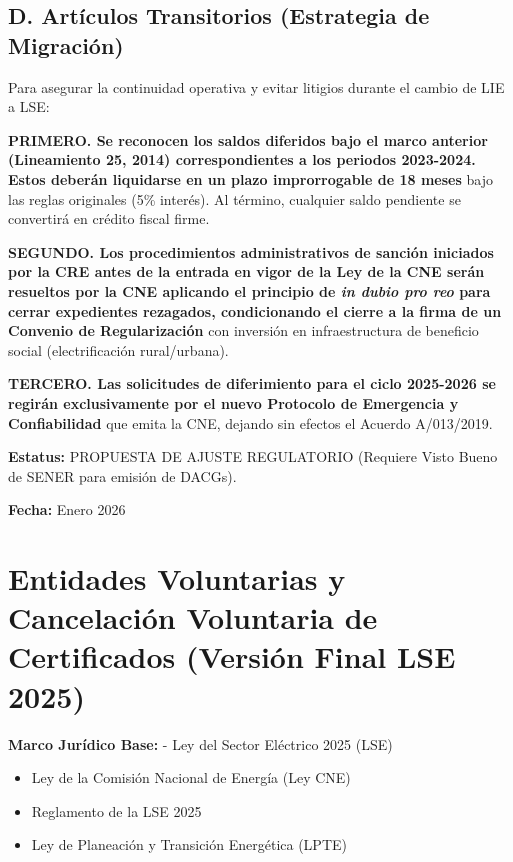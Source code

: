 \documentclass{cel}
\begin{document}
\subsection{D. Artículos Transitorios (Estrategia de Migración)}
\nopagebreak

Para asegurar la continuidad operativa y evitar litigios durante el cambio de LIE a LSE:


\textbf{PRIMERO. \textbf{ Se reconocen los saldos diferidos bajo el marco anterior (Lineamiento 25, 2014) correspondientes a los periodos 2023-2024. Estos deberán liquidarse en un plazo improrrogable de }18 meses} bajo las reglas originales (5\% interés). Al término, cualquier saldo pendiente se convertirá en crédito fiscal firme.


\textbf{SEGUNDO. \textbf{ Los procedimientos administrativos de sanción iniciados por la CRE antes de la entrada en vigor de la Ley de la CNE serán resueltos por la CNE aplicando el principio de \textit{in dubio pro reo} para cerrar expedientes rezagados, condicionando el cierre a la firma de un }Convenio de Regularización} con inversión en infraestructura de beneficio social (electrificación rural/urbana).


\textbf{TERCERO. \textbf{ Las solicitudes de diferimiento para el ciclo 2025-2026 se regirán exclusivamente por el nuevo }Protocolo de Emergencia y Confiabilidad} que emita la CNE, dejando sin efectos el Acuerdo A/013/2019.



\textbf{Estatus:} PROPUESTA DE AJUSTE REGULATORIO (Requiere Visto Bueno de SENER para emisión de DACGs).

\textbf{Fecha:} Enero 2026


{}
\section*{Entidades Voluntarias y Cancelación Voluntaria de Certificados (Versión Final LSE 2025)}
\nopagebreak

\textbf{Marco Jurídico Base:} - Ley del Sector Eléctrico 2025 (LSE)


\begin{itemize}
\item Ley de la Comisión Nacional de Energía (Ley CNE)
\item Reglamento de la LSE 2025
\item Ley de Planeación y Transición Energética (LPTE)


\end{itemize}
\end{document}
